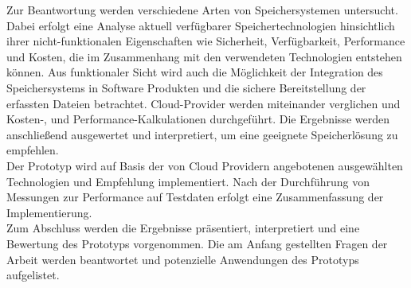 Zur Beantwortung werden verschiedene Arten von Speichersystemen untersucht. Dabei erfolgt eine Analyse  aktuell verfügbarer Speichertechnologien hinsichtlich ihrer nicht-funktionalen Eigenschaften wie Sicherheit, Verfügbarkeit, Performance und Kosten, die im Zusammenhang mit den verwendeten Technologien entstehen können. Aus funktionaler Sicht wird auch die Möglichkeit der Integration des Speichersystems in Software Produkten und die sichere Bereitstellung der erfassten Dateien betrachtet. Cloud-Provider werden miteinander verglichen und Kosten-, und Performance-Kalkulationen durchgeführt. Die Ergebnisse werden anschließend ausgewertet und interpretiert, um eine geeignete Speicherlösung zu empfehlen.\\

Der Prototyp wird auf Basis der von Cloud Providern angebotenen ausgewählten Technologien und Empfehlung implementiert. Nach der Durchführung von Messungen zur Performance auf Testdaten erfolgt eine Zusammenfassung der Implementierung.\\

Zum Abschluss werden die Ergebnisse präsentiert, interpretiert und eine Bewertung des Prototyps vorgenommen.  Die am Anfang gestellten Fragen der Arbeit werden beantwortet und potenzielle Anwendungen des Prototyps aufgelistet.

 